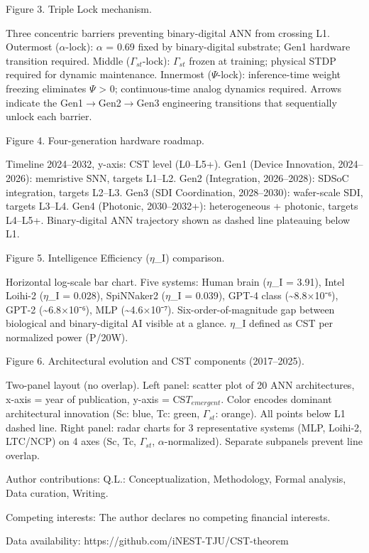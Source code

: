 \documentclass[a4paper,12pt]{article}
\begin{document}
Figure 3. Triple Lock mechanism.

Three concentric barriers preventing binary-digital ANN from crossing L1. Outermost ($\alpha$-lock): $\alpha$ = 0.69 fixed by binary-digital substrate; Gen1 hardware transition required. Middle ($\Gamma_{st}$-lock): $\Gamma_{st}$ frozen at training; physical STDP required for dynamic maintenance. Innermost ($\Psi$-lock): inference-time weight freezing eliminates $\Psi$ > 0; continuous-time analog dynamics required. Arrows indicate the Gen1$\rightarrow$Gen2$\rightarrow$Gen3 engineering transitions that sequentially unlock each barrier.

Figure 4. Four-generation hardware roadmap.

Timeline 2024--2032, y-axis: CST level (L0--L5+). Gen1 (Device Innovation, 2024--2026): memristive SNN, targets L1--L2. Gen2 (Integration, 2026--2028): SDSoC integration, targets L2--L3. Gen3 (SDI Coordination, 2028--2030): wafer-scale SDI, targets L3--L4. Gen4 (Photonic, 2030--2032+): heterogeneous + photonic, targets L4--L5+. Binary-digital ANN trajectory shown as dashed line plateauing below L1.

Figure 5. Intelligence Efficiency ($\eta$\_I) comparison.

Horizontal log-scale bar chart. Five systems: Human brain ($\eta$\_I = 3.91), Intel Loihi-2 ($\eta$\_I = 0.028), SpiNNaker2 ($\eta$\_I = 0.039), GPT-4 class (\textasciitilde{}8.8$\times$10⁻⁶), GPT-2 (\textasciitilde{}6.8$\times$10⁻⁶), MLP (\textasciitilde{}4.6$\times$10⁻⁷). Six-order-of-magnitude gap between biological and binary-digital AI visible at a glance. $\eta$\_I defined as CST per normalized power (P/20W).

Figure 6. Architectural evolution and CST components (2017--2025).

Two-panel layout (no overlap). Left panel: scatter plot of 20 ANN architectures, x-axis = year of publication, y-axis = CS$T_{emergent}$. Color encodes dominant architectural innovation (Sc: blue, Tc: green, $\Gamma_{st}$: orange). All points below L1 dashed line. Right panel: radar charts for 3 representative systems (MLP, Loihi-2, LTC/NCP) on 4 axes (Sc, Tc, $\Gamma_{st}$, $\alpha$-normalized). Separate subpanels prevent line overlap.

Author contributions: Q.L.: Conceptualization, Methodology, Formal analysis, Data curation, Writing.

Competing interests: The author declares no competing financial interests.

Data availability: https://github.com/iNEST-TJU/CST-theorem
\end{document}
